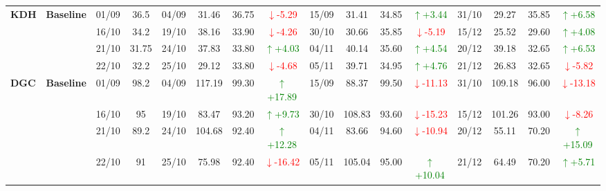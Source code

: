 {\begin{longtable}{llcc|cccc|cccc|cccc}
\multirow{4}{*}{\textbf{KDH}}
& \textbf{Baseline}
& 01/09 & 36.5 & 04/09 & 31.46 & 36.75 & \textcolor{red}{\(\downarrow\)-5.29} & 15/09 & 31.41 & 34.85 & \textcolor{green}{\(\uparrow\)+3.44} & 31/10 & 29.27 & 35.85 & \textcolor{green}{\(\uparrow\)+6.58} \\
& & 16/10 & 34.2 & 19/10 & 38.16 & 33.90 & \textcolor{red}{\(\downarrow\)-4.26} & 30/10 & 30.66 & 35.85 & \textcolor{red}{\(\downarrow\)-5.19} & 15/12 & 25.52 & 29.60 & \textcolor{green}{\(\uparrow\)+4.08} \\
& & 21/10 & 31.75 & 24/10 & 37.83 & 33.80 & \textcolor{green}{\(\uparrow\)+4.03} & 04/11 & 40.14 & 35.60 & \textcolor{green}{\(\uparrow\)+4.54} & 20/12 & 39.18 & 32.65 & \textcolor{green}{\(\uparrow\)+6.53} \\
& & 22/10 & 32.2 & 25/10 & 29.12 & 33.80 & \textcolor{red}{\(\downarrow\)-4.68} & 05/11 & 39.71 & 34.95 & \textcolor{green}{\(\uparrow\)+4.76} & 21/12 & 26.83 & 32.65 & \textcolor{red}{\(\downarrow\)-5.82} \\
\midrule

\multirow{4}{*}{\textbf{DGC}}
& \textbf{Baseline}
& 01/09 & 98.2 & 04/09 & 117.19 & 99.30 & \textcolor{green}{\(\uparrow\)+17.89} & 15/09 & 88.37 & 99.50 & \textcolor{red}{\(\downarrow\)-11.13} & 31/10 & 109.18 & 96.00 & \textcolor{red}{\(\downarrow\)-13.18} \\
& & 16/10 & 95 & 19/10 & 83.47 & 93.20 & \textcolor{green}{\(\uparrow\)+9.73} & 30/10 & 108.83 & 93.60 & \textcolor{red}{\(\downarrow\)-15.23} & 15/12 & 101.26 & 93.00 & \textcolor{red}{\(\downarrow\)-8.26} \\
& & 21/10 & 89.2 & 24/10 & 104.68 & 92.40 & \textcolor{green}{\(\uparrow\)+12.28} & 04/11 & 83.66 & 94.60 & \textcolor{red}{\(\downarrow\)-10.94} & 20/12 & 55.11 & 70.20 & \textcolor{green}{\(\uparrow\)+15.09} \\
& & 22/10 & 91 & 25/10 & 75.98 & 92.40 & \textcolor{red}{\(\downarrow\)-16.42} & 05/11 & 105.04 & 95.00 & \textcolor{green}{\(\uparrow\)+10.04} & 21/12 & 64.49 & 70.20 & \textcolor{green}{\(\uparrow\)+5.71} \\
\midrule


\end{longtable}}
